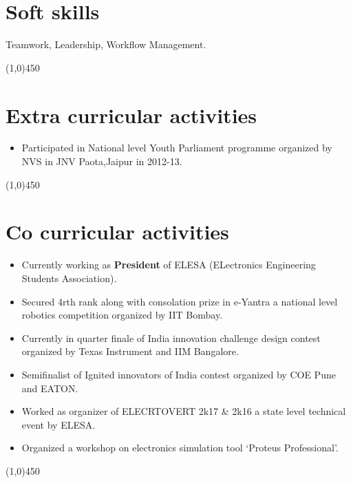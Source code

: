 \documentclass[10pt]{article}
\begin{document}
\section{Soft skills}
\hspace{1 cm} Teamwork, Leadership, Workflow Management.

\begin{center}
	\line(1,0){450}
\end{center}
\section{Extra curricular activities}
\begin{itemize}
	\item Participated in National level Youth Parliament programme organized by NVS in JNV Paota,Jaipur in 2012-13.
	
\end{itemize}
\begin{center}
	\line(1,0){450}
\end{center}

\section{Co curricular activities}
\begin{itemize}
	\item Currently working as \textbf{President} of ELESA (ELectronics Engineering Students Association).
	\item Secured 4rth rank along with consolation prize in e-Yantra a national level robotics competition organized by IIT Bombay.
	\item Currently in quarter finale of India innovation challenge design contest organized by Texas Instrument and IIM Bangalore.
	\item Semifinalist of Ignited innovators of India contest organized by COE Pune and EATON.
	\item Worked as organizer of ELECRTOVERT 2k17 \& 2k16 a state level technical event by ELESA.
	\item Organized a workshop on electronics simulation tool ‘Proteus Professional’. 
\end{itemize}
\begin{center}
	\line(1,0){450}
\end{center}
\end{document}
